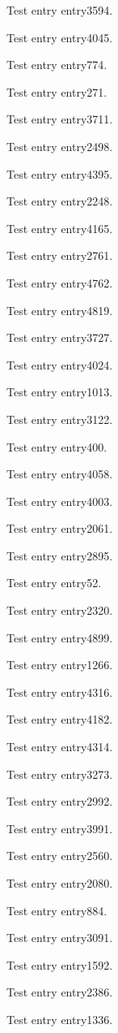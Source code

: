Test entry \gls{entry3594}.

Test entry \gls{entry4045}.

Test entry \gls{entry774}.

Test entry \gls{entry271}.

Test entry \gls{entry3711}.

Test entry \gls{entry2498}.

Test entry \gls{entry4395}.

Test entry \gls{entry2248}.

Test entry \gls{entry4165}.

Test entry \gls{entry2761}.

Test entry \gls{entry4762}.

Test entry \gls{entry4819}.

Test entry \gls{entry3727}.

Test entry \gls{entry4024}.

Test entry \gls{entry1013}.

Test entry \gls{entry3122}.

Test entry \gls{entry400}.

Test entry \gls{entry4058}.

Test entry \gls{entry4003}.

Test entry \gls{entry2061}.

Test entry \gls{entry2895}.

Test entry \gls{entry52}.

Test entry \gls{entry2320}.

Test entry \gls{entry4899}.

Test entry \gls{entry1266}.

Test entry \gls{entry4316}.

Test entry \gls{entry4182}.

Test entry \gls{entry4314}.

Test entry \gls{entry3273}.

Test entry \gls{entry2992}.

Test entry \gls{entry3991}.

Test entry \gls{entry2560}.

Test entry \gls{entry2080}.

Test entry \gls{entry884}.

Test entry \gls{entry3091}.

Test entry \gls{entry1592}.

Test entry \gls{entry2386}.

Test entry \gls{entry1336}.

